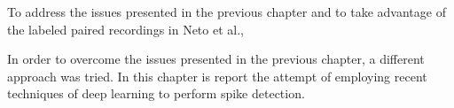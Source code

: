 To address the issues presented in the previous chapter and to take advantage of the labeled paired recordings in Neto et al.,

In order to overcome the issues presented in the previous chapter, a different approach was tried. In this chapter is report the attempt of employing recent techniques of deep learning to perform spike detection.

